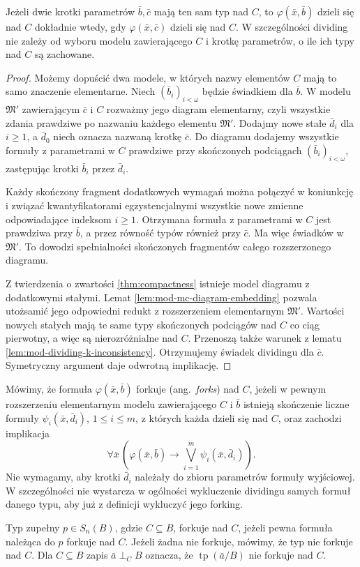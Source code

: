 \begin{lemat}
\label{lem:mod-dividing-invariance}
Jeżeli dwie krotki parametrów $\bar b,\bar c$
mają ten sam typ nad $C$, to
$\varphi(\bar x,\bar b)$ dzieli się nad $C$
dokładnie wtedy, gdy $\varphi(\bar x,\bar c)$
dzieli się nad $C$.
W szczególności dividing nie zależy od wyboru
modelu zawierającego $C$ i krotkę parametrów,
o ile ich typy nad $C$ są zachowane.
\end{lemat}
\begin{proof}
Możemy dopuścić dwa modele, w których
nazwy elementów $C$ mają to samo znaczenie
elementarne. Niech $(\bar b_i)_{i<\omega}$
będzie świadkiem dla $\bar b$.
W modelu $\mathfrak M'$ zawierającym
$\bar c$ i $C$ rozważmy jego diagram elementarny,
czyli wszystkie zdania prawdziwe po nazwaniu
każdego elementu $\mathfrak M'$.
Dodajmy nowe stałe $\bar d_i$ dla $i\geq1$,
a $\bar d_0$ niech oznacza nazwaną krotkę $\bar c$.
Do diagramu dodajemy wszystkie formuły
z parametrami w $C$ prawdziwe przy skończonych
podciągach $(\bar b_i)_{i<\omega}$,
zastępując krotki $\bar b_i$ przez $\bar d_i$.

Każdy skończony fragment dodatkowych wymagań
można połączyć w koniunkcję i związać
kwantyfikatorami egzystencjalnymi wszystkie
nowe zmienne odpowiadające indeksom $i\geq1$.
Otrzymana formuła z parametrami w $C$
jest prawdziwa przy $\bar b$,
a przez równość typów również przy $\bar c$.
Ma więc świadków w $\mathfrak M'$.
To dowodzi spełnialności skończonych fragmentów
całego rozszerzonego diagramu.

Z twierdzenia o zwartości \ref{thm:compactness}
istnieje model diagramu z dodatkowymi stałymi.
Lemat \ref{lem:mod-mc-diagram-embedding}
pozwala utożsamić jego odpowiedni redukt
z rozszerzeniem elementarnym $\mathfrak M'$.
Wartości nowych stałych mają te same typy
skończonych podciągów nad $C$ co ciąg pierwotny,
a więc są nierozróżnialne nad $C$.
Przenoszą także warunek z lematu
\ref{lem:mod-dividing-k-inconsistency}.
Otrzymujemy świadek dividingu dla $\bar c$.
Symetryczny argument daje odwrotną implikację.
\end{proof}

\begin{definicja}
\label{def:mod-forking}
Mówimy, że formuła $\varphi(\bar x,\bar b)$
forkuje (ang.~\emph{forks}) nad $C$,
jeżeli w pewnym rozszerzeniu elementarnym
modelu zawierającego $C$ i $\bar b$
istnieją skończenie liczne formuły
$\psi_i(\bar x,\bar d_i)$, $1\leq i\leq m$,
z których każda dzieli się nad $C$,
oraz zachodzi implikacja
\[
\forall\bar x\,
\left(\varphi(\bar x,\bar b)\to
\bigvee_{i=1}^{m}\psi_i(\bar x,\bar d_i)\right).
\]
Nie wymagamy, aby krotki $\bar d_i$ należały
do zbioru parametrów formuły wyjściowej.
W szczególności nie wystarcza w ogólności
wykluczenie dividingu samych formuł danego typu,
aby już z definicji wykluczyć jego forking.

Typ zupełny $p\in S_n(B)$, gdzie $C\subseteq B$,
forkuje nad $C$, jeżeli pewna formuła należąca
do $p$ forkuje nad $C$.
Jeżeli żadna nie forkuje, mówimy, że typ
nie forkuje nad $C$.
Dla $C\subseteq B$ zapis
$\bar a\mathrel{\perp_C}B$
oznacza, że $\operatorname{tp}(\bar a/B)$
nie forkuje nad $C$.
\end{definicja}


